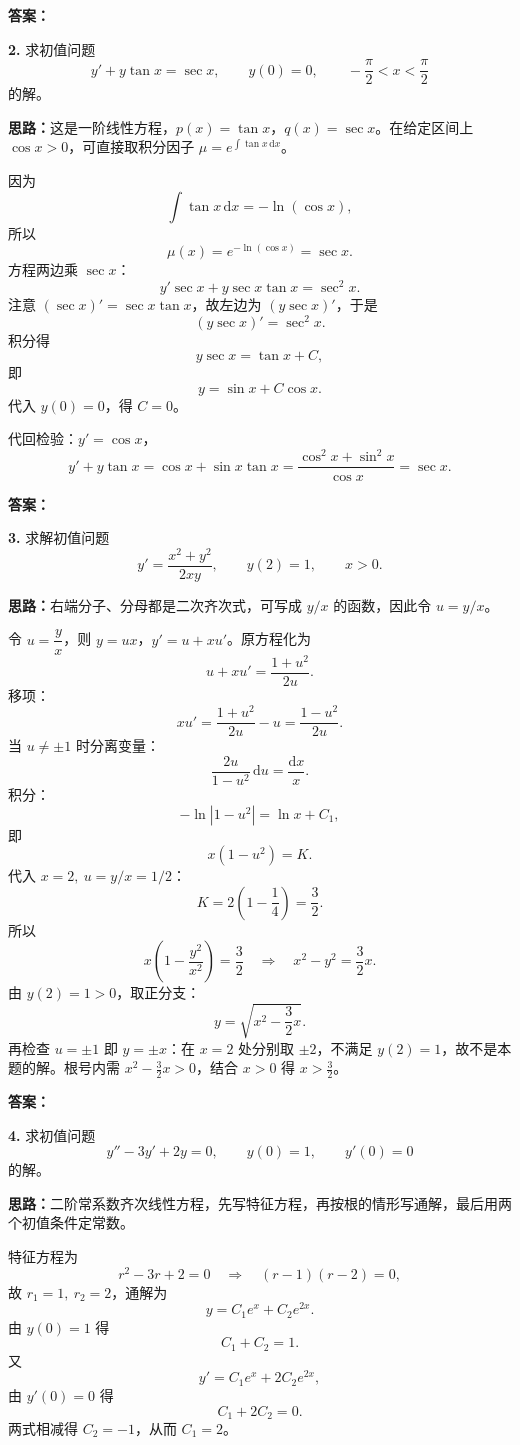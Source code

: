 \textbf{答案：}

\else \answerarea[8] \fi%
\textbf{2.} 求初值问题
\[
y'+y\tan x=\sec x,\qquad y(0)=0,\qquad -\frac{\pi}{2}<x<\frac{\pi}{2}
\]
的解。

\ifshowsolutions%
\textbf{思路：}这是一阶线性方程，$p(x)=\tan x$，$q(x)=\sec x$。在给定区间上 $\cos x>0$，可直接取积分因子 $\mu=e^{\int \tan x\,\mathrm{d}x}$。

因为
\[
\int \tan x\,\mathrm{d}x=-\ln(\cos x),
\]
所以
\[
\mu(x)=e^{-\ln(\cos x)}=\sec x.
\]
方程两边乘 $\sec x$：
\[
y'\sec x+y\sec x\tan x=\sec^2 x.
\]
注意 $(\sec x)'=\sec x\tan x$，故左边为 $(y\sec x)'$，于是
\[
(y\sec x)'=\sec^2 x.
\]
积分得
\[
y\sec x=\tan x+C,
\]
即
\[
y=\sin x+C\cos x.
\]
代入 $y(0)=0$，得 $C=0$。

代回检验：$y'=\cos x$，
\[
y'+y\tan x=\cos x+\sin x\tan x
=\frac{\cos^2x+\sin^2x}{\cos x}=\sec x.
\]

\textbf{答案：}

\else \answerarea[8] \fi%
\textbf{3.} 求解初值问题
\[
y'=\frac{x^2+y^2}{2xy},\qquad y(2)=1,\qquad x>0.
\]

\ifshowsolutions%
\textbf{思路：}右端分子、分母都是二次齐次式，可写成 $y/x$ 的函数，因此令 $u=y/x$。

令 $u=\dfrac{y}{x}$，则 $y=ux$，$y'=u+xu'$。原方程化为
\[
u+xu'=\frac{1+u^2}{2u}.
\]
移项：
\[
xu'=\frac{1+u^2}{2u}-u=\frac{1-u^2}{2u}.
\]
当 $u\neq\pm1$ 时分离变量：
\[
\frac{2u}{1-u^2}\,\mathrm{d}u=\frac{\mathrm{d}x}{x}.
\]
积分：
\[
-\ln|1-u^2|=\ln x+C_1,
\]
即
\[
x(1-u^2)=K.
\]
代入 $x=2,\ u=y/x=1/2$：
\[
K=2\left(1-\frac14\right)=\frac32.
\]
所以
\[
x\left(1-\frac{y^2}{x^2}\right)=\frac32
\quad\Longrightarrow\quad
x^2-y^2=\frac32x.
\]
由 $y(2)=1>0$，取正分支：
\[
y=\sqrt{x^2-\frac32x}.
\]
再检查 $u=\pm1$ 即 $y=\pm x$：在 $x=2$ 处分别取 $\pm2$，不满足 $y(2)=1$，故不是本题的解。根号内需 $x^2-\frac32x>0$，结合 $x>0$ 得 $x>\frac32$。

\textbf{答案：}

\else \answerarea[8] \fi%
\textbf{4.} 求初值问题
\[
y''-3y'+2y=0,\qquad y(0)=1,\qquad y'(0)=0
\]
的解。

\ifshowsolutions%
\textbf{思路：}二阶常系数齐次线性方程，先写特征方程，再按根的情形写通解，最后用两个初值条件定常数。

特征方程为
\[
r^2-3r+2=0
\quad\Longrightarrow\quad
(r-1)(r-2)=0,
\]
故 $r_1=1,\ r_2=2$，通解为
\[
y=C_1e^x+C_2e^{2x}.
\]
由 $y(0)=1$ 得
\[
C_1+C_2=1.
\]
又
\[
y'=C_1e^x+2C_2e^{2x},
\]
由 $y'(0)=0$ 得
\[
C_1+2C_2=0.
\]
两式相减得 $C_2=-1$，从而 $C_1=2$。

